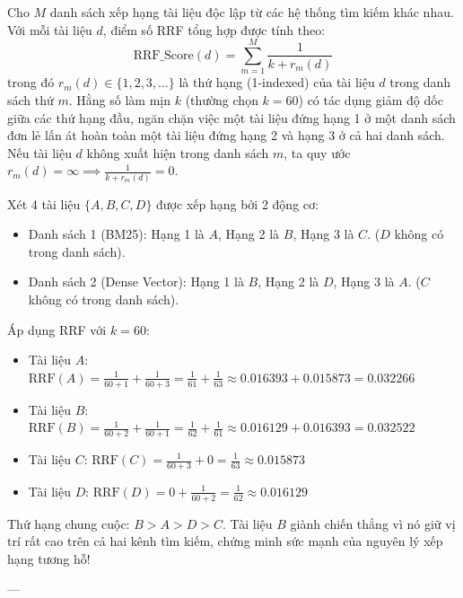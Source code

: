 \begin{definition}
Cho $M$ danh sách xếp hạng tài liệu độc lập từ các hệ thống tìm kiếm khác nhau. Với mỗi tài liệu $d$, điểm số RRF tổng hợp được tính theo:
\begin{equation}
\text{RRF\_Score}(d) = \sum_{m=1}^M \frac{1}{k + r_m(d)}
\end{equation}
trong đó $r_m(d) \in \{1, 2, 3, \dots\}$ là thứ hạng (1-indexed) của tài liệu $d$ trong danh sách thứ $m$. Hằng số làm mịn $k$ (thường chọn $k = 60$) có tác dụng giảm độ dốc giữa các thứ hạng đầu, ngăn chặn việc một tài liệu đứng hạng 1 ở một danh sách đơn lẻ lấn át hoàn toàn một tài liệu đứng hạng 2 và hạng 3 ở cả hai danh sách. Nếu tài liệu $d$ không xuất hiện trong danh sách $m$, ta quy ước $r_m(d) = \infty \implies \frac{1}{k + r_m(d)} = 0$.
\end{definition}

\begin{example}
Xét 4 tài liệu $\{A, B, C, D\}$ được xếp hạng bởi 2 động cơ:
\begin{itemize}
  \item Danh sách 1 (BM25): Hạng 1 là $A$, Hạng 2 là $B$, Hạng 3 là $C$. ($D$ không có trong danh sách).
  \item Danh sách 2 (Dense Vector): Hạng 1 là $B$, Hạng 2 là $D$, Hạng 3 là $A$. ($C$ không có trong danh sách).
\end{itemize}
Áp dụng RRF với $k = 60$:
\begin{itemize}
  \item Tài liệu $A$: $\text{RRF}(A) = \frac{1}{60 + 1} + \frac{1}{60 + 3} = \frac{1}{61} + \frac{1}{63} \approx 0.016393 + 0.015873 = 0.032266$
  \item Tài liệu $B$: $\text{RRF}(B) = \frac{1}{60 + 2} + \frac{1}{60 + 1} = \frac{1}{62} + \frac{1}{61} \approx 0.016129 + 0.016393 = 0.032522$
  \item Tài liệu $C$: $\text{RRF}(C) = \frac{1}{60 + 3} + 0 = \frac{1}{63} \approx 0.015873$
  \item Tài liệu $D$: $\text{RRF}(D) = 0 + \frac{1}{60 + 2} = \frac{1}{62} \approx 0.016129$
\end{itemize}
Thứ hạng chung cuộc: \textbf{$B > A > D > C$}.
Tài liệu $B$ giành chiến thắng vì nó giữ vị trí rất cao trên cả hai kênh tìm kiếm, chứng minh sức mạnh của nguyên lý xếp hạng tương hỗ!
\end{example}

---

